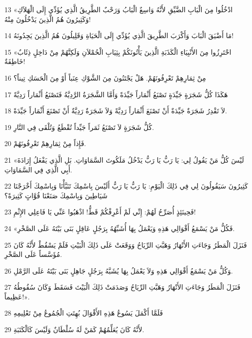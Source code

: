 \par 13 «ادْخُلُوا مِنَ الْبَابِ الضَّيِّقِ لأَنَّهُ وَاسِعٌ الْبَابُ وَرَحْبٌ الطَّرِيقُ الَّذِي يُؤَدِّي إِلَى الْهَلاَكِ وَكَثِيرُونَ هُمُ الَّذِينَ يَدْخُلُونَ مِنْهُ!
\par 14 مَا أَضْيَقَ الْبَابَ وَأَكْرَبَ الطَّرِيقَ الَّذِي يُؤَدِّي إِلَى الْحَيَاةِ وَقَلِيلُونَ هُمُ الَّذِينَ يَجِدُونَهُ!
\par 15 «احْتَرِزُوا مِنَ الأَنْبِيَاءِ الْكَذَبَةِ الَّذِينَ يَأْتُونَكُمْ بِثِيَابِ الْحُمْلاَنِ وَلَكِنَّهُمْ مِنْ دَاخِلٍ ذِئَابٌ خَاطِفَةٌ!
\par 16 مِنْ ثِمَارِهِمْ تَعْرِفُونَهُمْ. هَلْ يَجْتَنُونَ مِنَ الشَّوْكِ عِنَباً أَوْ مِنَ الْحَسَكِ تِيناً؟
\par 17 هَكَذَا كُلُّ شَجَرَةٍ جَيِّدَةٍ تَصْنَعُ أَثْمَاراً جَيِّدَةً وَأَمَّا الشَّجَرَةُ الرَّدِيَّةُ فَتَصْنَعُ أَثْمَاراً رَدِيَّةً
\par 18 لاَ تَقْدِرُ شَجَرَةٌ جَيِّدَةٌ أَنْ تَصْنَعَ أَثْمَاراً رَدِيَّةً وَلاَ شَجَرَةٌ رَدِيَّةٌ أَنْ تَصْنَعَ أَثْمَاراً جَيِّدَةً.
\par 19 كُلُّ شَجَرَةٍ لاَ تَصْنَعُ ثَمَراً جَيِّداً تُقْطَعُ وَتُلْقَى فِي النَّارِ.
\par 20 فَإِذاً مِنْ ثِمَارِهِمْ تَعْرِفُونَهُمْ.
\par 21 «لَيْسَ كُلُّ مَنْ يَقُولُ لِي: يَا رَبُّ يَا رَبُّ يَدْخُلُ مَلَكُوتَ السَّمَاوَاتِ. بَلِ الَّذِي يَفْعَلُ إِرَادَةَ أَبِي الَّذِي فِي السَّمَاوَاتِ.
\par 22 كَثِيرُونَ سَيَقُولُونَ لِي فِي ذَلِكَ الْيَوْمِ: يَا رَبُّ يَا رَبُّ أَلَيْسَ بِاسْمِكَ تَنَبَّأْنَا وَبِاسْمِكَ أَخْرَجْنَا شَيَاطِينَ وَبِاسْمِكَ صَنَعْنَا قُوَّاتٍ كَثِيرَةً؟
\par 23 فَحِينَئِذٍ أُصَرِّحُ لَهُمْ: إِنِّي لَمْ أَعْرِفْكُمْ قَطُّ! اذْهَبُوا عَنِّي يَا فَاعِلِي الإِثْمِ!
\par 24 «فَكُلُّ مَنْ يَسْمَعُ أَقْوَالِي هَذِهِ وَيَعْمَلُ بِهَا أُشَبِّهُهُ بِرَجُلٍ عَاقِلٍ بَنَى بَيْتَهُ عَلَى الصَّخْرِ.
\par 25 فَنَزَلَ الْمَطَرُ وَجَاءَتِ الأَنْهَارُ وَهَبَّتِ الرِّيَاحُ وَوَقَعَتْ عَلَى ذَلِكَ الْبَيْتِ فَلَمْ يَسْقُطْ لأَنَّهُ كَانَ مُؤَسَّساً عَلَى الصَّخْرِ.
\par 26 وَكُلُّ مَنْ يَسْمَعُ أَقْوَالِي هَذِهِ وَلاَ يَعْمَلُ بِهَا يُشَبَّهُ بِرَجُلٍ جَاهِلٍ بَنَى بَيْتَهُ عَلَى الرَّمْلِ.
\par 27 فَنَزَلَ الْمَطَرُ وَجَاءَتِ الأَنْهَارُ وَهَبَّتِ الرِّيَاحُ وَصَدَمَتْ ذَلِكَ الْبَيْتَ فَسَقَطَ وَكَانَ سُقُوطُهُ عَظِيماً!».
\par 28 فَلَمَّا أَكْمَلَ يَسُوعُ هَذِهِ الأَقْوَالَ بُهِتَتِ الْجُمُوعُ مِنْ تَعْلِيمِهِ
\par 29 لأَنَّهُ كَانَ يُعَلِّمُهُمْ كَمَنْ لَهُ سُلْطَانٌ وَلَيْسَ كَالْكَتَبَةِ.

